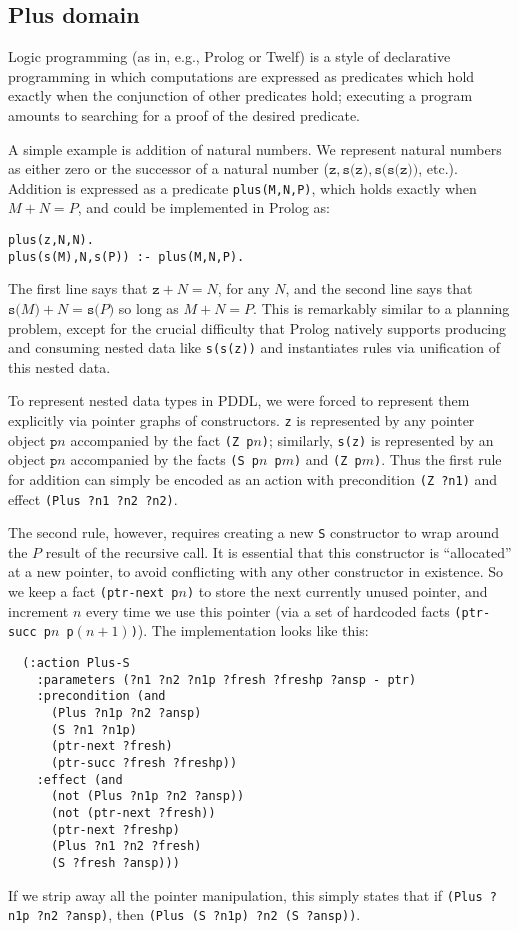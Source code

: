 
\subsection{Plus domain}

Logic programming (as in, e.g., Prolog or Twelf) is a style of declarative
programming in which computations are expressed as predicates which hold exactly
when the conjunction of other predicates hold; executing a program amounts to
searching for a proof of the desired predicate.

A simple example is addition of natural numbers. We represent natural numbers as
either zero or the successor of a natural number ($\texttt{z}, \texttt{s(z)},
\texttt{s(s(z))}$, etc.). Addition is expressed as a predicate
\texttt{plus(M,N,P)}, which holds exactly when $M+N=P$, and could be implemented
in Prolog as:
\begin{verbatim}
plus(z,N,N).
plus(s(M),N,s(P)) :- plus(M,N,P).
\end{verbatim}
The first line says that $\texttt{z}+N=N$, for any $N$, and the second line says
that $\texttt{s(}M\texttt{)}+N=\texttt{s(}P\texttt{)}$ so long as $M+N=P$. This
is remarkably similar to a planning problem, except for the crucial difficulty
that Prolog natively supports producing and consuming nested data like
\texttt{s(s(z))} and instantiates rules via unification of this nested data.

To represent nested data types in PDDL, we were forced to represent them
explicitly via pointer graphs of constructors. \texttt{z} is represented by any
pointer object $\texttt{p}n$ accompanied by the fact \texttt{(Z p$n$)};
similarly, \texttt{s(z)} is represented by an object $\texttt{p}n$ accompanied
by the facts \texttt{(S p$n$ p$m$)} and \texttt{(Z p$m$)}. Thus the first rule
for addition can simply be encoded as an action with precondition \texttt{(Z
?n1)} and effect \texttt{(Plus ?n1 ?n2 ?n2)}.

The second rule, however, requires creating a new \texttt{S} constructor to wrap
around the $P$ result of the recursive call. It is essential that this
constructor is ``allocated'' at a new pointer, to avoid conflicting with any
other constructor in existence. So we keep a fact \texttt{(ptr-next p$n$)} to
store the next currently unused pointer, and increment $n$ every time we use
this pointer (via a set of hardcoded facts \texttt{(ptr-succ p$n$ p$(n+1)$)}).
The implementation looks like this:
{\small
\begin{verbatim}
  (:action Plus-S
    :parameters (?n1 ?n2 ?n1p ?fresh ?freshp ?ansp - ptr)
    :precondition (and
      (Plus ?n1p ?n2 ?ansp)
      (S ?n1 ?n1p)
      (ptr-next ?fresh)
      (ptr-succ ?fresh ?freshp))
    :effect (and
      (not (Plus ?n1p ?n2 ?ansp))
      (not (ptr-next ?fresh))
      (ptr-next ?freshp)
      (Plus ?n1 ?n2 ?fresh)
      (S ?fresh ?ansp)))
\end{verbatim}}
If we strip away all the pointer manipulation, this simply states that if
\texttt{(Plus ?n1p ?n2 ?ansp)}, then \texttt{(Plus (S ?n1p) ?n2 (S ?ansp))}.

